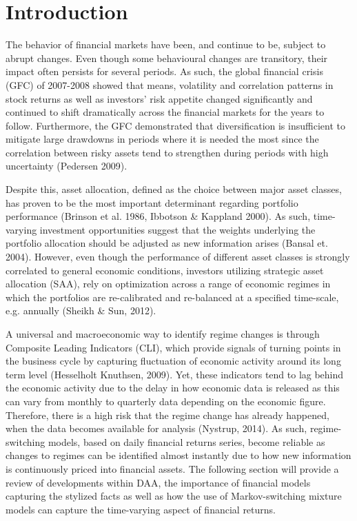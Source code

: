 \section{Introduction}
The behavior of financial markets have been, and continue to be, subject to abrupt changes. Even though some behavioural changes are transitory, their impact often persists for several periods. As such, the global financial crisis (GFC) of 2007-2008 showed that means, volatility and correlation patterns in stock returns as well as investors' risk appetite changed significantly and continued to shift dramatically across the financial markets for the years to follow. Furthermore, the GFC demonstrated that diversification is insufficient to mitigate large drawdowns in periods where it is needed the most since the correlation between risky assets tend to strengthen during periods with high uncertainty (Pedersen 2009). 

Despite this, asset allocation, defined as the choice between major asset classes, has proven to be the most important determinant regarding portfolio performance (Brinson et al. 1986, Ibbotson \& Kappland 2000). As such, time-varying investment opportunities suggest that the weights underlying the portfolio allocation should be adjusted as new information arises (Bansal et. 2004). However, even though the performance of different asset classes is strongly correlated to general economic conditions, investors utilizing strategic asset allocation (SAA), rely on optimization across a range of economic regimes in which the portfolios are re-calibrated and re-balanced at a specified time-scale, e.g. annually (Sheikh \& Sun, 2012).

A universal and macroeconomic way to identify regime changes is through Composite Leading Indicators (CLI), which provide signals of turning points in the business cycle by capturing fluctuation of economic activity around its long term level (Hesselholt Knuthsen, 2009). Yet, these indicators tend to lag behind the economic activity due to the delay in how economic data is released as this can vary from monthly to quarterly data depending on the economic figure. Therefore, there is a high risk that the regime change has already happened, when the data becomes available for analysis (Nystrup, 2014). As such, regime-switching models, based on daily financial returns series, become reliable as changes to regimes can be identified almost instantly due to how new information is continuously priced into financial assets. The following section will provide a review of developments within DAA, the importance of financial models capturing the stylized facts as well as how the use of Markov-switching mixture models can capture the time-varying aspect of financial returns. 

